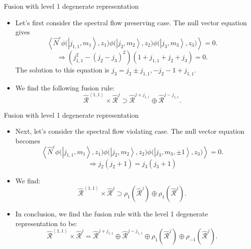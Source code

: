 \documentclass{beamer}
\newcommand{\ket}[1]{\left| #1 \right\rangle}
\newcommand{\vev}[1]{\left\langle #1 \right\rangle}
\begin{document}
\begin{frame}{Fusion with level 1 degenerate representation}
  \begin{itemize}
    \item Let's first consider the spectral flow preserving case. The null vector equation gives
      \begin{equation*}
        \vev{\hat{N}^{c} \phi \Big(\ket{j_{1,1},m_{1}}, z_{1}\Big) \phi \Big(\ket{j_{2},m_{2}},z_{2} \Big) \phi \Big(\ket{j_{3},m_{3}},z_{3} \Big)} = 0. 
      \end{equation*}
      \begin{equation*}
        \Longrightarrow \left( j_{1,1}^{2} - (j_{2}-j_{3})^{2} \right)(1+j_{1,1}+j_{2}+j_{3}) = 0.
      \end{equation*}
      The solution to this equation is $j_{3} = j_{2} \pm j_{1,1}, -j_{2} - 1 + j_{1,1}$. 
    \item We find the following fusion rule: 
      \begin{equation*}
        \hat{\mathcal{R}}^{\vev{1,1}} \times \hat{\mathcal{R}}^{j} \supset \hat{\mathcal{R}}^{j+j_{1,1}} \oplus \hat{\mathcal{R}}^{j-j_{1,1}}.
      \end{equation*}
  \end{itemize}
\end{frame}

\begin{frame}{Fusion with level 1 degenerate representation}
  \begin{itemize}
    \item Next, let's consider the spectral flow violating case. The null vector equation becomes
      \begin{equation*}
          \vev{\hat{N}^{c} \phi \Big(\ket{j_{1,1},m_{1}}, z_{1}\Big) \phi \Big(\ket{j_{2},m_{2}},z_{2} \Big) \phi \Big(\ket{j_{3},m_{3}, \pm 1},z_{3} \Big)} = 0. 
      \end{equation*}
      \begin{equation*}
        \Longrightarrow j_{2}(j_{2}+1) = j_{3} (j_{3}+1)
      \end{equation*}
    \item We find: 
      \begin{equation*}
        \hat{\mathcal{R}}^{\vev{1,1}} \times \hat{\mathcal{R}}^{j} \supset \rho_{ 1} \left(\hat{\mathcal{R}}^{j}\right) \oplus \rho_{ 1} \left(\hat{\mathcal{R}}^{j}\right).
      \end{equation*}
    \item In conclusion, we find the fusion rule with the level 1 degenerate representation to be:
      \begin{equation*}
        \widehat{\mathcal{R}}^{\vev{1,1}} \times \widehat{\mathcal{R}}^{j} = \widehat{\mathcal{R}}^{j+j_{1,1}} \oplus \widehat{\mathcal{R}}^{j-j_{1,1}}
    \oplus \rho_{1} \left( \widehat{\mathcal{R}}^{j} \right) \oplus \rho_{-1} \left( \widehat{\mathcal{R}}^{j} \right). \label{mainresult}
      \end{equation*}
  \end{itemize}
\end{frame}
\end{document}
